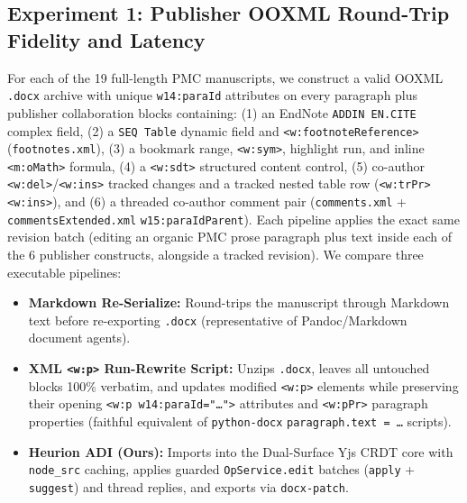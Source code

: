 \documentclass[11pt,a4paper]{article}
\begin{document}
\subsection{Experiment 1: Publisher OOXML Round-Trip Fidelity and Latency}
For each of the 19 full-length PMC manuscripts, we construct a valid OOXML \texttt{.docx} archive with unique \texttt{w14:paraId} attributes on every paragraph plus publisher collaboration blocks containing: (1) an EndNote \texttt{ADDIN EN.CITE} complex field, (2) a \texttt{SEQ Table} dynamic field and \texttt{<w:footnoteReference>} (\texttt{footnotes.xml}), (3) a bookmark range, \texttt{<w:sym>}, highlight run, and inline \texttt{<m:oMath>} formula, (4) a \texttt{<w:sdt>} structured content control, (5) co-author \texttt{<w:del>}/\texttt{<w:ins>} tracked changes and a tracked nested table row (\texttt{<w:trPr><w:ins>}), and (6) a threaded co-author comment pair (\texttt{comments.xml} + \texttt{commentsExtended.xml} \texttt{w15:paraIdParent}). Each pipeline applies the exact same revision batch (editing an organic PMC prose paragraph plus text inside each of the 6 publisher constructs, alongside a tracked revision). We compare three executable pipelines:
\begin{itemize}[leftmargin=1.5em,itemsep=1pt]
  \item \textbf{Markdown Re-Serialize:} Round-trips the manuscript through Markdown text before re-exporting \texttt{.docx} (representative of Pandoc/Markdown document agents).
  \item \textbf{XML \texttt{<w:p>} Run-Rewrite Script:} Unzips \texttt{.docx}, leaves all untouched blocks 100\% verbatim, and updates modified \texttt{<w:p>} elements while preserving their opening \texttt{<w:p w14:paraId="\dots">} attributes and \texttt{<w:pPr>} paragraph properties (faithful equivalent of \texttt{python-docx} \texttt{paragraph.text = \dots} scripts).
  \item \textbf{Heurion ADI (Ours):} Imports into the Dual-Surface Yjs CRDT core with \texttt{node\_src} caching, applies guarded \texttt{OpService.edit} batches (\texttt{apply} + \texttt{suggest}) and thread replies, and exports via \texttt{docx-patch}.
\end{itemize}
\end{document}
